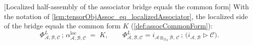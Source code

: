 \begin{lemma}



[Localized half-assembly of the associator bridge equals the common form]
  \label{lem:tensorObjAssoc_hK_lhs}
  With the notation of \cref{lem:tensorObjAssoc_eq_localizedAssociator}, the
  localized side of the bridge equals the common form \(K\)
  (\cref{def:assocCommonForm}):
  \[
    \Phi^{L}_{\mathcal{A},\mathcal{B},\mathcal{C}} \,;\,
      \alpha^{\mathrm{loc}}_{\mathcal{A},\mathcal{B},\mathcal{C}}
    \;=\; K,
    \qquad
    \Phi^{L}_{\mathcal{A},\mathcal{B},\mathcal{C}}
      = i_{\mathcal{A} \otimes_{\mathcal{O}_X} \mathcal{B},\,\mathcal{C}}
        \,;\, \bigl(i_{\mathcal{A},\mathcal{B}} \rhd \mathcal{C}\bigr).
  \]
\end{lemma}

